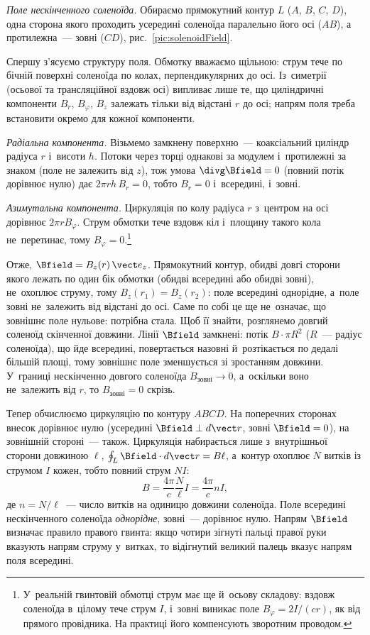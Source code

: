 \emph{Поле нескінченного соленоїда.} Обираємо прямокутний контур $L$ ($A$, $B$, $C$,
$D$), одна сторона якого проходить усередині соленоїда паралельно його осі ($AB$), а
протилежна~--- зовні ($CD$), рис.~\ref{pic:solenoidField}.

Спершу з'ясуємо структуру поля. Обмотку вважаємо щільною: струм тече по бічній поверхні
соленоїда по колах, перпендикулярних до осі. Із~симетрії (осьової та трансляційної вздовж
осі) випливає лише те, що циліндричні компоненти $B_r$, $B_\varphi$, $B_z$ залежать тільки від
відстані $r$ до осі; напрям поля треба встановити окремо для кожної компоненти.

\textit{Радіальна компонента.} Візьмемо замкнену поверхню~--- коаксіальний циліндр радіуса
$r$ і~висоти $h$. Потоки через торці однакові за модулем і~протилежні за знаком (поле не
залежить від $z$), тож умова $\divg\Bfield=0$ (повний потік дорівнює нулю) дає
$2\pi r h\,B_r = 0$, тобто $B_r=0$ і~всередині, і~зовні.

\textit{Азимутальна компонента.} Циркуляція по колу радіуса $r$ з~центром на осі дорівнює
$2\pi r B_\varphi$. Струм обмотки тече вздовж кіл і~площину такого кола не~перетинає, тому
$B_\varphi = 0$.\footnote{У~реальній гвинтовій обмотці струм має ще й~осьову складову:
вздовж соленоїда в~цілому тече струм $I$, і~зовні виникає поле $B_\varphi = 2I/(cr)$, як
від прямого провідника. На практиці його компенсують зворотним проводом.}

Отже, $\Bfield = B_z(r)\,\vect e_z$. Прямокутний контур, обидві довгі сторони якого лежать
по один бік обмотки (обидві всередині або обидві зовні), не~охоплює струму, тому
$B_z(r_1) = B_z(r_2)$: поле всередині однорідне, а~поле зовні не~залежить від відстані до
осі. Саме по собі це ще не~означає, що зовнішнє поле нульове: потрібна стала. Щоб
її знайти, розглянемо довгий соленоїд скінченної довжини. Лінії $\Bfield$ замкнені: потік
$B\cdot\pi R^2$ ($R$~--- радіус соленоїда), що йде всередині, повертається назовні й~розтікається по дедалі більшій
площі, тому зовнішнє поле зменшується зі зростанням довжини. У~границі нескінченно довгого
соленоїда $B_{\text{зовні}}\to0$, а~оскільки воно не~залежить від $r$, то
$B_{\text{зовні}}=0$ скрізь.

Тепер обчислюємо циркуляцію по контуру $ABCD$. На поперечних сторонах внесок дорівнює
нулю (усередині $\Bfield\perp d\vect r$, зовні $\Bfield = 0$), на зовнішній стороні~---
також. Циркуляція набирається лише з~внутрішньої сторони довжиною $\ell$,
$\oint_L \Bfield \cdot d\vect r = B\ell$, а~контур охоплює $N$ витків із струмом $I$
кожен, тобто повний струм $NI$:
\begin{equation*}
	B = \frac{4\pi}{c}\frac{N}{\ell}I = \frac{4\pi}{c}nI,
\end{equation*}
де $n = N/\ell$~--- число витків на одиницю довжини соленоїда. Поле всередині
нескінченного соленоїда \emph{однорідне}, зовні~--- дорівнює нулю. Напрям $\Bfield$ визначає
правило правого гвинта: якщо чотири зігнуті пальці правої руки вказують напрям струму у~витках,
то відігнутий великий палець вказує напрям поля всередині.

